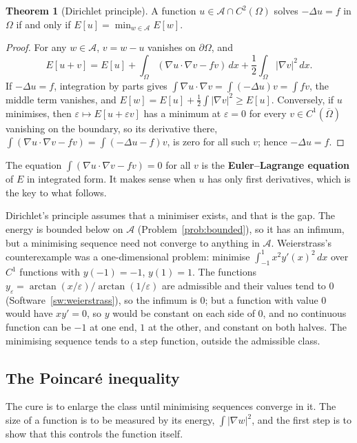 \documentclass[11pt,a4paper]{article}
\numberwithin{equation}{section}
\theoremstyle{definition}
\newtheorem{thm}{Theorem}[subsection]
\begin{document}
\begin{thm}[Dirichlet principle]
\label{thm:dirichletprinciple}
A function $u \in \mathcal A \cap C^2(\Omega)$ solves $-\Delta u = f$ in $\Omega$ if and only if $E[u] = \min_{w \in \mathcal A}E[w]$.
\end{thm}

\begin{proof}
For any $w \in \mathcal A$, $v = w - u$ vanishes on $\partial\Omega$, and
\[
E[u + v] = E[u] + \int_\Omega(\nabla u\cdot\nabla v - fv)\,dx + \frac12\int_\Omega|\nabla v|^2\,dx .
\]
If $-\Delta u = f$, integration by parts gives $\int\nabla u\cdot\nabla v = \int(-\Delta u)v = \int fv$, the middle term vanishes, and $E[w] = E[u] + \frac12\int|\nabla v|^2 \geq E[u]$. Conversely, if $u$ minimises, then $\varepsilon \mapsto E[u + \varepsilon v]$ has a minimum at $\varepsilon = 0$ for every $v \in C^1(\overline\Omega)$
vanishing on the boundary, so its derivative there, $\int(\nabla u\cdot\nabla v - fv) = \int(-\Delta u - f)v$, is zero for all such $v$; hence $-\Delta u = f$.
\end{proof}

The equation $\int(\nabla u\cdot\nabla v - fv) = 0$ for all $v$ is the \textbf{Euler--Lagrange equation} of $E$ in integrated form. It makes sense when $u$ has only first derivatives, which is the key to what follows.

Dirichlet's principle assumes that a minimiser exists, and that is the gap. The energy is bounded below on $\mathcal A$ (Problem~\ref{prob:bounded}), so it has an infimum, but a minimising sequence need not converge to anything in $\mathcal A$. Weierstrass's counterexample was a one-dimensional problem:
minimise $\int_{-1}^1x^2y'(x)^2\,dx$ over $C^1$ functions with $y(-1) = -1$, $y(1) = 1$. The functions $y_\varepsilon = \arctan(x/\varepsilon)/\arctan(1/\varepsilon)$ are admissible and their values tend to $0$ (Software~\ref{sw:weierstrass}), so the infimum is $0$; but a function with value $0$ would have $xy' = 0$, so $y$ would be
constant on each side of $0$, and no continuous function can be $-1$ at one end, $1$ at the other, and constant on both halves. The minimising sequence tends to a step function, outside the admissible class.

\subsection{The Poincar\'e inequality}
\label{ssec:poincare}

The cure is to enlarge the class until minimising sequences converge in it. The size of a function is to be measured by its energy, $\int|\nabla w|^2$, and the first step is to show that this controls the function itself.
\end{document}
